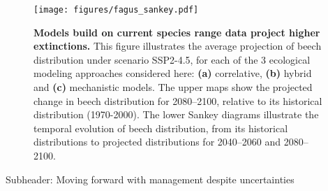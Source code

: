 \documentclass[11pt,letter]{article}
\begin{document}

\begin{figure}
	\centering
	\texttt{[image: figures/fagus\_sankey.pdf]}
	\caption{\textbf{Models build on current species range data project higher extinctions.} This figure illustrates the average projection of beech distribution under scenario SSP2-4.5, for each of the 3 ecological modeling approaches considered here: \textbf{(a)} correlative, \textbf{(b)} hybrid and \textbf{(c)} mechanistic models. The upper maps show the projected change in beech distribution for 2080–2100, relative to its historical distribution (1970-2000). The lower Sankey diagrams illustrate the temporal evolution of beech distribution, from its historical distributions to projected distributions for 2040–2060 and 2080–2100.}
	\label{fig:diffproj}
\end{figure}


Subheader: Moving forward with management despite uncertainties 
\end{document}
